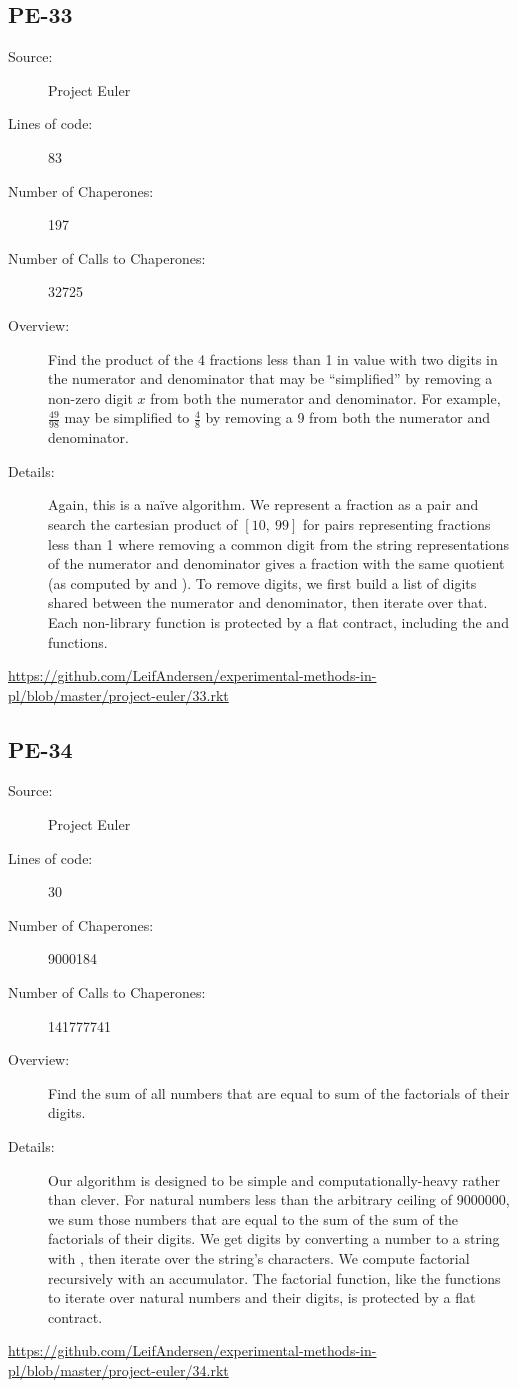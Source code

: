 \subsection*{PE-33~\hrulefill}
\begin{description}
\item[Source:] Project Euler
\item[Lines of code:] 83
\item[Number of Chaperones:] 197
\item[Number of Calls to Chaperones:] 32725
\item[Overview:]
  Find the product of the 4 fractions less than 1 in value with two digits in the numerator and denominator that may be ``simplified'' by removing a non-zero digit $x$ from both the numerator and denominator.
  For example, $\frac{49}{98}$ may be simplified to $\frac{4}{8}$ by removing a 9 from both the numerator and denominator.
\item[Details:] 
  Again, this is a na\"ive algorithm.
  We represent a fraction as a  pair and search the cartesian product of $[10,~99]$ for pairs representing fractions less than 1 where removing a common digit from the string representations of the numerator and denominator gives a fraction with the same quotient (as computed by \mono{/} and ).
  To remove digits, we first build a list of digits shared between the numerator and denominator, then iterate over that.
  Each non-library function is protected by a flat contract, including the  and  functions.
\end{description}
\url{https://github.com/LeifAndersen/experimental-methods-in-pl/blob/master/project-euler/33.rkt}

\subsection*{PE-34~\hrulefill}
\begin{description}
\item[Source:] Project Euler
\item[Lines of code:] 30
\item[Number of Chaperones:] 9000184
\item[Number of Calls to Chaperones:] 141777741
\item[Overview:]
  Find the sum of all numbers that are equal to sum of the factorials of their digits.
\item[Details:] 
  Our algorithm is designed to be simple and computationally-heavy rather than clever.
  For natural numbers less than the arbitrary ceiling of 9000000, we sum those numbers that are equal to the sum of the sum of the factorials of their digits.
  We get digits by converting a number to a string with , then iterate over the string's characters.
  We compute factorial recursively with an accumulator.
  The factorial function, like the functions to iterate over natural numbers and their digits, is protected by a flat contract.
\end{description}
\url{https://github.com/LeifAndersen/experimental-methods-in-pl/blob/master/project-euler/34.rkt}

